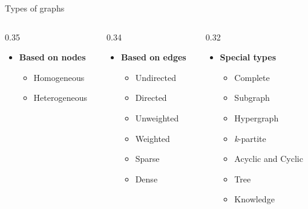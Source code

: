 \documentclass{beamer}
\begin{document}
    \begin{frame}{Types of graphs}
        \begin{columns}[t] %
            \begin{column}{0.35\textwidth}
               \begin{itemize}
                    \item \textbf{Based on nodes}
                    \begin{itemize}
                        \item Homogeneous
                        \item Heterogeneous
                    \end{itemize}
                \end{itemize}
            \end{column}
            
            \begin{column}{0.34\textwidth}
               \begin{itemize}
                    \item \textbf{Based on edges}
                    \begin{itemize}
                        \item Undirected
                        \item Directed
                        \item Unweighted
                        \item Weighted
                        \item Sparse
                        \item Dense
                    \end{itemize}
                \end{itemize}
            \end{column}

            \begin{column}{0.32\textwidth}
               \begin{itemize}
                    \item \textbf{Special types}
                    \begin{itemize}
                        \item Complete
                        \item Subgraph
                        \item Hypergraph
                        \item \textit{k}-partite
                        \item Acyclic and Cyclic
                        \item Tree
                        \item Knowledge            
                    \end{itemize}
                \end{itemize}
            \end{column}
        \end{columns}


\end{frame}
\end{document}
